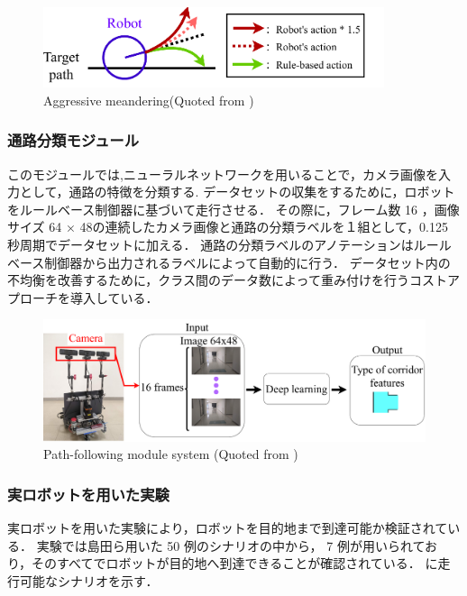 \begin{figure}[htbp]
  \centering
  \includegraphics[width=100mm]{images/pdf/fujiwara/behavior.pdf}
  \caption[Aggressive meandering]{Aggressive meandering(Quoted from \cite{fujiwara2023})}
  \label{fig:behavior}
\end{figure}

\subsubsection{通路分類モジュール}
このモジュールでは,ニューラルネットワークを用いることで，カメラ画像を入力として，通路の特徴を分類する.
データセットの収集をするために，ロボットをルールベース制御器に基づいて走行させる．
その際に，フレーム数 16 ，画像サイズ 64 × 48の連続したカメラ画像と通路の分類ラベルを１組として，0.125 秒周期でデータセットに加える．
通路の分類ラベルのアノテーションはルールベース制御器から出力されるラベルによって自動的に行う．
データセット内の不均衡を改善するために，クラス間のデータ数によって重み付けを行うコストアプローチを導入している．

\begin{figure}[htbp]
  \centering
   \includegraphics[width=130mm]{images/pdf/haruyama/intersection_sys.pdf}
   \caption[Path-following module system]{Path-following module system (Quoted from \cite{haruyama2023})}
   \label{fig:intersection}
\end{figure}

\subsubsection{実ロボットを用いた実験}
実ロボットを用いた実験により，ロボットを目的地まで到達可能か検証されている．
実験では島田ら用いた 50 例のシナリオの中から， 7 例が用いられており，そのすべてでロボットが目的地へ到達できることが確認されている．
に走行可能なシナリオを示す．

